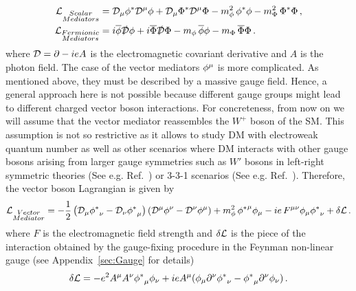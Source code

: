 \begin{align}
{\cal L}_{\substack{Scalar\\Mediators}} &=  {\cal D}_\mu {\phi^*}  {\cal D}^\mu {\phi} + 
 {\cal D}_\mu {\Phi^*}  {\cal D}^\mu {\Phi} - m_\phi^2\, {\phi^*} {\phi} -m_{\Phi}^2\, {\Phi^*} {\Phi} \,,\label{eq:ScalarMediator}
\\
{\cal L}_{\substack{Fermionic\\Mediators}} &=i\overline{{\phi}}  \slashed{\cal D}{\phi} +
 i\overline{{\Phi}}  \slashed{\cal D}{\Phi} - m_\phi\, \overline{{\phi}} {\phi}- m_{\Phi}\, \overline{{\Phi}} {\Phi}\,. \label{eq:FermionicMediator}
\end{align}
%
where ${\cal D}= \partial - ie A$ is the electromagnetic covariant derivative and $A$ is the photon field. 
The case of the vector mediators ${\phi}^\mu$ is more complicated. As mentioned above, they must be described by a massive gauge field. Hence, a general approach here is not possible because different gauge groups might lead to different charged vector boson interactions. For concreteness, from now on we will assume that the vector mediator reassembles the $W^+$ boson of the SM. This assumption is not so restrictive as it allows to study DM  with electroweak quantum number as well as other  scenarios where DM interacts with other gauge bosons arising from larger gauge symmetries  such as $W'$ bosons in left-right symmetric theories (See e.g. Ref.~\cite{Heeck:2015qra,Garcia-Cely:2015quu}) or 3-3-1 scenarios (See e.g. Ref.~\cite{TavaresVelasco:2001vb}). Therefore, the vector boson Lagrangian is given by 
\begin{equation}
{\cal L }_{\substack{Vector\\Mediator}}=-\frac{1}{2}\left({\cal D}_\mu {\phi^*}_\nu -{\cal D}_\nu {\phi^*}_\mu \right)\left({\cal D}^\mu {\phi}^{\nu} -{\cal D}^\nu {\phi}^{\mu} \right)+ m_\phi^2\, {\phi^*}^{\mu}{\phi}_\mu-ie\,F^{\mu\nu} {\phi}_\mu{\phi^*}_\nu +\delta{\cal L}\, .
\label{eq:VectorMediator}
\end{equation}
where $F$ is the electromagnetic field strength and $\delta{\cal L}$ is the piece of the interaction obtained by the gauge-fixing  procedure in the Feynman non-linear gauge (see Appendix~\ref{sec:Gauge} for details)
\begin{equation}
\delta {\cal L}= 
 - e^2 A^\mu A^\nu  {\phi^*}_\mu {\phi}_\nu
+i  e A^\mu ( {\phi}_\mu \partial^\nu {\phi^*}_\nu-  {\phi^*}_\mu \partial^\nu {\phi}_\nu)\,.
\end{equation}
%


